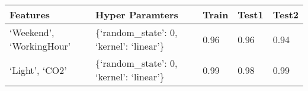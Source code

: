 \documentclass[11pt]{article}
\begin{document}
    \begin{longtable}[]{@{}lllll@{}}
\toprule
\begin{minipage}[b]{0.34\columnwidth}\raggedright
Features\strut
\end{minipage} & \begin{minipage}[b]{0.33\columnwidth}\raggedright
Hyper Paramters\strut
\end{minipage} & \begin{minipage}[b]{0.06\columnwidth}\raggedright
Train\strut
\end{minipage} & \begin{minipage}[b]{0.06\columnwidth}\raggedright
Test1\strut
\end{minipage} & \begin{minipage}[b]{0.06\columnwidth}\raggedright
Test2\strut
\end{minipage}\tabularnewline
\midrule
\endhead
\begin{minipage}[t]{0.34\columnwidth}\raggedright
`Weekend', `WorkingHour'\strut
\end{minipage} & \begin{minipage}[t]{0.33\columnwidth}\raggedright
\{`random\_state': 0, `kernel': `linear'\}\strut
\end{minipage} & \begin{minipage}[t]{0.06\columnwidth}\raggedright
0.96\strut
\end{minipage} & \begin{minipage}[t]{0.06\columnwidth}\raggedright
0.96\strut
\end{minipage} & \begin{minipage}[t]{0.06\columnwidth}\raggedright
0.94\strut
\end{minipage}\tabularnewline
\begin{minipage}[t]{0.34\columnwidth}\raggedright
`Light', `CO2'\strut
\end{minipage} & \begin{minipage}[t]{0.33\columnwidth}\raggedright
\{`random\_state': 0, `kernel': `linear'\}\strut
\end{minipage} & \begin{minipage}[t]{0.06\columnwidth}\raggedright
0.99\strut
\end{minipage} & \begin{minipage}[t]{0.06\columnwidth}\raggedright
0.98\strut
\end{minipage} & \begin{minipage}[t]{0.06\columnwidth}\raggedright
0.99\strut
\end{minipage}\tabularnewline

\end{longtable}
\end{document}
